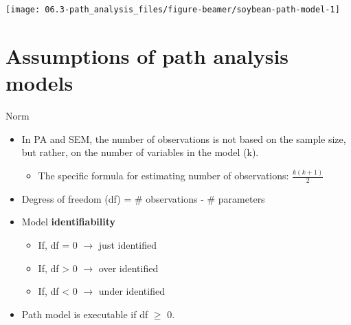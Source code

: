 \documentclass[11pt,dvipsnames,ignorenonframetext,aspectratio=169]{beamer}
\providecommand{\tightlist}{%
  \setlength{\itemsep}{0pt}\setlength{\parskip}{0pt}}
\begin{document}
\begin{frame}{}
\protect\hypertarget{section-7}{}
\texttt{[image: 06.3-path\_analysis\_files/figure-beamer/soybean-path-model-1]}
\end{frame}

\hypertarget{assumptions-of-path-analysis-models}{%
\section{Assumptions of path analysis
models}\label{assumptions-of-path-analysis-models}}

\begin{frame}{Norm}
\protect\hypertarget{norm}{}
\begin{itemize}
\tightlist
\item
  In PA and SEM, the number of observations is not based on the sample
  size, but rather, on the number of variables in the model (k).

  \begin{itemize}
  \tightlist
  \item
    The specific formula for estimating number of observations:
    \(\frac{k(k+1)}{2}\)
  \end{itemize}
\item
  Degress of freedom (df) = \# observations - \# parameters
\item
  Model \textbf{identifiability}

  \begin{itemize}
  \tightlist
  \item
    If, df = 0 \(\longrightarrow\) just identified
  \item
    If, df \textgreater{} 0 \(\longrightarrow\) over identified
  \item
    If, df \textless{} 0 \(\longrightarrow\) under identified
  \end{itemize}
\item
  Path model is executable if df \(\geq\) 0.
\end{itemize}
\end{frame}
\end{document}
